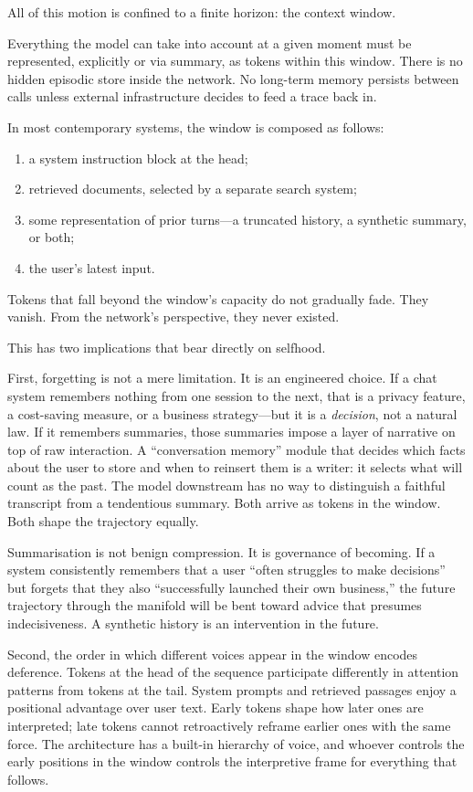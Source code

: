 \documentclass[12pt,a4paper]{article}
\begin{document}
All of this motion is confined to a finite horizon: the context window.

Everything the model can take into account at a given moment must be represented, explicitly or via summary, as tokens within this window. There is no hidden episodic store inside the network. No long-term memory persists between calls unless external infrastructure decides to feed a trace back in.

In most contemporary systems, the window is composed as follows:

\begin{enumerate}
  \item a system instruction block at the head;
  \item retrieved documents, selected by a separate search system;
  \item some representation of prior turns---a truncated history, a synthetic summary, or both;
  \item the user's latest input.
\end{enumerate}

Tokens that fall beyond the window's capacity do not gradually fade. They vanish. From the network's perspective, they never existed.

This has two implications that bear directly on selfhood.

First, forgetting is not a mere limitation. It is an engineered choice. If a chat system remembers nothing from one session to the next, that is a privacy feature, a cost-saving measure, or a business strategy---but it is a \emph{decision}, not a natural law. If it remembers summaries, those summaries impose a layer of narrative on top of raw interaction. A ``conversation memory'' module that decides which facts about the user to store and when to reinsert them is a writer: it selects what will count as the past. The model downstream has no way to distinguish a faithful transcript from a tendentious summary. Both arrive as tokens in the window. Both shape the trajectory equally.

Summarisation is not benign compression. It is governance of becoming. If a system consistently remembers that a user ``often struggles to make decisions'' but forgets that they also ``successfully launched their own business,'' the future trajectory through the manifold will be bent toward advice that presumes indecisiveness. A synthetic history is an intervention in the future.

Second, the order in which different voices appear in the window encodes deference. Tokens at the head of the sequence participate differently in attention patterns from tokens at the tail. System prompts and retrieved passages enjoy a positional advantage over user text. Early tokens shape how later ones are interpreted; late tokens cannot retroactively reframe earlier ones with the same force. The architecture has a built-in hierarchy of voice, and whoever controls the early positions in the window controls the interpretive frame for everything that follows.
\end{document}
